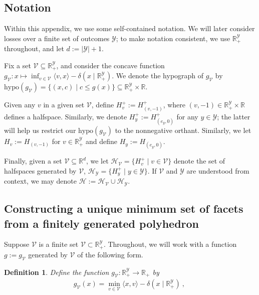 \documentclass[11pt]{article}
\newcommand{\reals}{\mathbb{R}}
\renewcommand{\H}{\mathcal{H}}
\newcommand{\V}{\mathcal{V}}
\newcommand{\Y}{\mathcal{Y}}
\newcommand{\inprod}[2]{\langle #1, #2 \rangle}%
\newcommand{\hyp}{\mathrm{hypo}}
\newtheorem{definition}{Definition}
\begin{document}
\subsection{Notation}
Within this appendix, we use some self-contained notation.
We will later consider losses over a finite set of outcomes $\Y$; to make notation consistent, we use $\reals^\Y_+$ throughout, and let $d := |\Y|+1$.

Fix a set $\V \subseteq \reals^\Y_+$, and consider the concave function $g_\V : x \mapsto \inf_{v \in \V}\inprod{v}{x} - \delta(x \mid \reals^\Y_+)$.
We denote the hypograph of $g_\V$ by $\hyp(g_\V) = \{(x,c) \mid c \leq g(x)\} \subseteq \reals^\Y_+ \times \reals$.

Given any $v$ in a given set $\V$, define $H^+_v := H^+_{(v, -1)}$, where $(v, -1)\in\reals^\Y_+\times\reals$ defines a halfspace.
Similarly, we denote $H_y^+ := H_{(e_y, 0)}^+$ for any $y \in \Y$; the latter will help us restrict our $\hyp(g_\V)$ to the nonnegative orthant. 
Similarly, we let $H_v := H_{(v,-1)}$ for $v \in \reals^\Y_+$ and define $H_y := H_{(e_y, 0)}$. 

Finally, given a set $\V \subseteq \reals^d$, we let $\H_{\V} = \{H_v^+ \mid v\in\V\}$ denote the set of halfspaces generated by $\V$, $\H_\Y = \{H_y^+ \mid y\in\Y\}$.
If $\V$ and $\Y$ are understood from context, we may denote $\H := \H_\V \cup\H_\Y$.


\subsection{Constructing a unique minimum set of facets from a finitely generated polyhedron}\label{appsubsec:phase1}
Suppose $\V$ is a finite set $\V \subset \reals_+^\Y$.
Throughout, we will work with a function $g := g_\V$ generated by $\V$ of the following form.

\begin{definition}\label{def:g-finite}
  Define the function $g_\V : \reals_+^\Y \to \reals_+$ by
  \begin{align*}
    g_\V(x) = \min_{v\in\V} \inprod{x}{v} - \delta(x \mid \reals_+^\Y)~,~
  \end{align*}
\end{definition}
\end{document}
